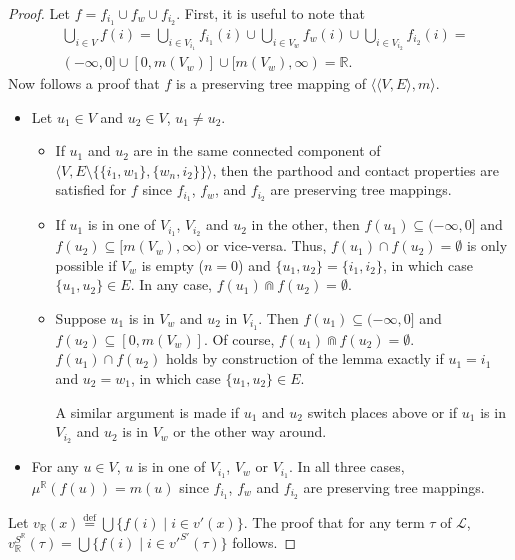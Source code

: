 \documentclass{article}
\newcommand{\R}{\mathbb{R}}
\newcommand{\bcap}{\Cap}
\newcommand{\lang}{\mathcal{L}}
\newcommand{\eqdef}{\stackrel{\text{def}}{=}}
\begin{document}
\begin{proof}
    Let $f = f_{i_1} \cup f_w \cup f_{i_2}$. First, it is useful to note that
    \begin{align*}
      & \bigcup_{i \in V}f(i) = \bigcup_{i \in V_{i_1}}f_{i_1}(i) \cup \bigcup_{i \in V_w}f_w(i) \cup \bigcup_{i \in V_{i_2}}f_{i_2}(i) = \\
      & (-\infty, 0] \cup [0, m(V_w)] \cup [m(V_w), \infty) = \R.
    \end{align*}
    Now follows a proof that $f$ is a preserving tree mapping of $\langle \langle V, E \rangle, m \rangle$.
    \begin{itemize}
    \item Let $u_1 \in V$ and $u_2 \in V$, $u_1 \neq u_2$.
      \begin{itemize}
      \item If $u_1$ and $u_2$ are in the same connected component of $\langle V, E \setminus \{\{i_1, w_1\}, \{w_n, i_2\}\} \rangle$, then the parthood and contact properties are satisfied for $f$ since $f_{i_1}$, $f_w$, and $f_{i_2}$ are preserving tree mappings.
      \item If $u_1$ is in one of $V_{i_1}$, $V_{i_2}$ and $u_2$ in the other, then $f(u_1) \subseteq (-\infty, 0]$ and $f(u_2) \subseteq [m(V_w), \infty)$ or vice-versa.
    Thus, $f(u_1) \cap f(u_2) = \emptyset$ is only possible if $V_w$ is empty ($n = 0$) and $\{u_1, u_2\} = \{i_1, i_2\}$, in which case $\{u_1, u_2\} \in E$. In any case, $f(u_1) \bcap f(u_2) = \emptyset$.
  \item Suppose $u_1$ is in $V_w$ and $u_2$ in $V_{i_1}$. Then $f(u_1) \subseteq (-\infty, 0]$ and $f(u_2) \subseteq [0, m(V_w)]$. Of course, $f(u_1) \bcap f(u_2) = \emptyset$. $f(u_1) \cap f(u_2)$ holds by construction of the lemma exactly if $u_1 = i_1$ and $u_2 = w_1$, in  which case $\{u_1, u_2\} \in E$.

    A similar argument is made if $u_1$ and $u_2$ switch places above or if $u_1$ is in $V_{i_2}$ and $u_2$ is in $V_w$ or the other way around.
      \end{itemize}
    \item For any $u \in V$, $u$ is in one of $V_{i_1}$, $V_w$ or $V_{i_1}$. In all three cases, $\mu^\R(f(u)) = m(u)$ since $f_{i_1}$, $f_w$ and $f_{i_2}$ are preserving tree mappings.
    \end{itemize}

    Let $v_\R(x) \eqdef \bigcup\{ f(i) \mid i \in v'(x) \}$. The proof that for any term $\tau$ of $\lang$, $v_\R^{S^\R}(\tau) = \bigcup\{ f(i) \mid i \in v'^{S'}(\tau)\}$ follows.


\end{proof}
\end{document}
